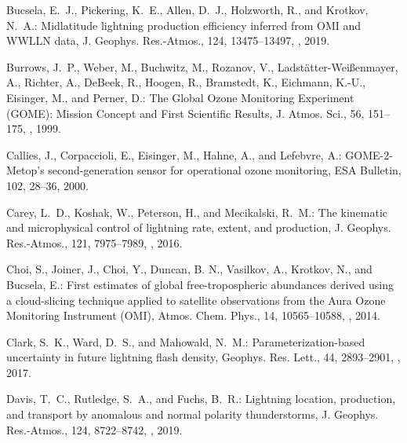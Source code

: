 \documentclass[amt]{copernicus}
\begin{document}
\begin{thebibliography}{105}
Bucsela, E.~J., Pickering, K.~E., Allen, D.~J., Holzworth, R., and Krotkov,
  N.~A.: Midlatitude lightning  production efficiency
  inferred from OMI and WWLLN data, J. Geophys. Res.-Atmos.,  124, 13475--13497, , 2019.

Burrows, J.~P., Weber, M., Buchwitz, M., Rozanov, V., Ladstätter-Weißenmayer,
  A., Richter, A., DeBeek, R., Hoogen, R., Bramstedt, K., Eichmann, K.-U.,
  Eisinger, M., and Perner, D.: The Global Ozone Monitoring Experiment (GOME):
  Mission Concept and First Scientific Results, J. Atmos. Sci., 56, 151--175,
  , 1999.

Callies, J., Corpaccioli, E., Eisinger, M., Hahne, A., and Lefebvre, A.:
  GOME-2-Metop's second-generation sensor for operational ozone monitoring, ESA
  Bulletin, 102, 28--36, 2000.

Carey, L.~D., Koshak, W., Peterson, H., and Mecikalski, R.~M.: The kinematic
  and microphysical control of lightning rate, extent, and  production,
  J. Geophys. Res.-Atmos., 121, 7975--7989,
  , 2016.

Choi, S., Joiner, J., Choi, Y., Duncan, B. N., Vasilkov, A., Krotkov, N., and Bucsela, E.: First estimates of global free-tropospheric  abundances derived using a cloud-slicing technique applied to satellite observations from the Aura Ozone Monitoring Instrument (OMI), Atmos. Chem. Phys., 14, 10565–10588, , 2014.

Clark, S.~K., Ward, D.~S., and Mahowald, N.~M.: Parameterization-based
  uncertainty in future lightning flash density,
  Geophys. Res. Lett.,
  44, 2893--2901, , 2017.

Davis, T.~C., Rutledge, S.~A., and Fuchs, B.~R.: Lightning location, 
  production, and transport by anomalous and normal polarity thunderstorms,
  J. Geophys. Res.-Atmos., 124, 8722--8742, ,
  2019.


\end{thebibliography}
\end{document}
